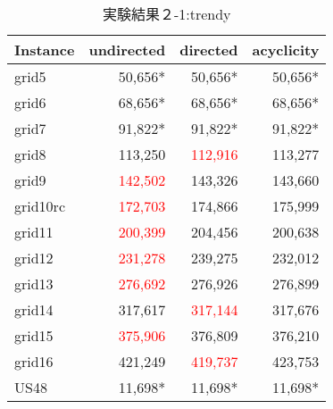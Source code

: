 \begin{table}[htbp]
  \caption{実験結果２-1:trendy}
  \label{min_table_tr}
  \centering
  \begin{tabular}{|l|rrr|}
    \hline
    Instance&undirected&directed&acyclicity \\
    \hline
    grid5&50,656*&50,656*&50,656* \\
    grid6&68,656*&68,656*&68,656* \\
    grid7&91,822*&91,822*&91,822* \\
grid8&113,250&\textcolor{red}{112,916}&113,277 \\
grid9&\textcolor{red}{142,502}&143,326&143,660 \\
grid10rc&\textcolor{red}{172,703}&174,866&175,999 \\
grid11&\textcolor{red}{200,399}&204,456&200,638 \\
grid12&\textcolor{red}{231,278}&239,275&232,012 \\
grid13&\textcolor{red}{276,692}&276,926&276,899 \\
grid14&317,617&\textcolor{red}{317,144}&317,676 \\
grid15&\textcolor{red}{375,906}&376,809&376,210 \\
grid16&421,249&\textcolor{red}{419,737}&423,753 \\
US48&11,698*&11,698*&11,698* \\
    \hline
  \end{tabular}
\end{table}
